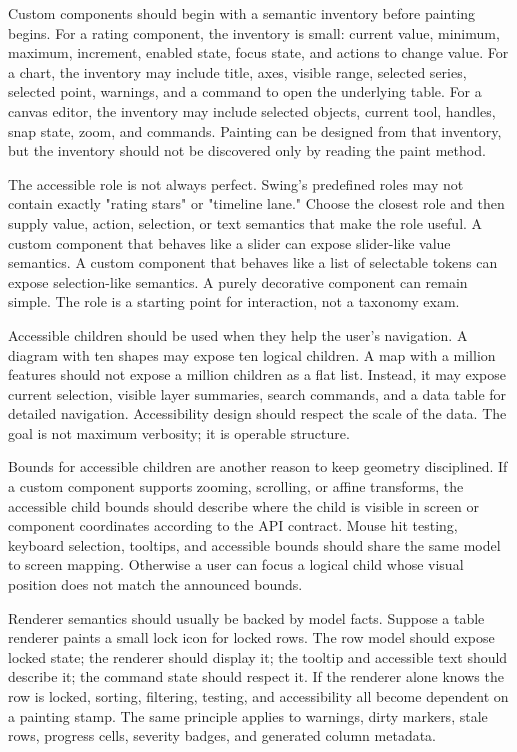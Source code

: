 Custom components should begin with a semantic inventory before painting begins.
For a rating component, the inventory is small: current value, minimum, maximum,
increment, enabled state, focus state, and actions to change value. For a chart,
the inventory may include title, axes, visible range, selected series, selected
point, warnings, and a command to open the underlying table. For a canvas editor,
the inventory may include selected objects, current tool, handles, snap state,
zoom, and commands. Painting can be designed from that inventory, but the
inventory should not be discovered only by reading the paint method.

The accessible role is not always perfect. Swing's predefined roles may not
contain exactly "rating stars" or "timeline lane." Choose the closest role and
then supply value, action, selection, or text semantics that make the role
useful. A custom component that behaves like a slider can expose slider-like
value semantics. A custom component that behaves like a list of selectable
tokens can expose selection-like semantics. A purely decorative component can
remain simple. The role is a starting point for interaction, not a taxonomy
exam.

Accessible children should be used when they help the user's navigation. A
diagram with ten shapes may expose ten logical children. A map with a million
features should not expose a million children as a flat list. Instead, it may
expose current selection, visible layer summaries, search commands, and a data
table for detailed navigation. Accessibility design should respect the scale of
the data. The goal is not maximum verbosity; it is operable structure.

Bounds for accessible children are another reason to keep geometry disciplined.
If a custom component supports zooming, scrolling, or affine transforms, the
accessible child bounds should describe where the child is visible in screen or
component coordinates according to the API contract. Mouse hit testing,
keyboard selection, tooltips, and accessible bounds should share the same model
to screen mapping. Otherwise a user can focus a logical child whose visual
position does not match the announced bounds.

Renderer semantics should usually be backed by model facts. Suppose a table
renderer paints a small lock icon for locked rows. The row model should expose
locked state; the renderer should display it; the tooltip and accessible text
should describe it; the command state should respect it. If the renderer alone
knows the row is locked, sorting, filtering, testing, and accessibility all
become dependent on a painting stamp. The same principle applies to warnings,
dirty markers, stale rows, progress cells, severity badges, and generated
column metadata.

